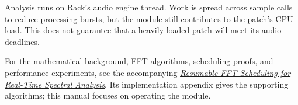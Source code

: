 \documentclass[12pt,letterpaper]{article}
\begin{document}
Analysis runs on Rack's audio engine thread. Work is spread across sample
calls to reduce processing bursts, but the module still contributes to the
patch's CPU load. This does not guarantee that a heavily loaded patch will
meet its audio deadlines.

For the mathematical background, FFT algorithms, scheduling proofs, and
performance experiments, see the accompanying
\href{https://github.com/Kautenja/ArhythmeticUnits-Fourier/tree/main/docs/whitepaper}{\textit{Resumable FFT Scheduling for Real-Time Spectral Analysis}}.
Its implementation appendix gives the supporting algorithms; this manual
focuses on operating the module.


\clearpage
\finalPage
\end{document}
